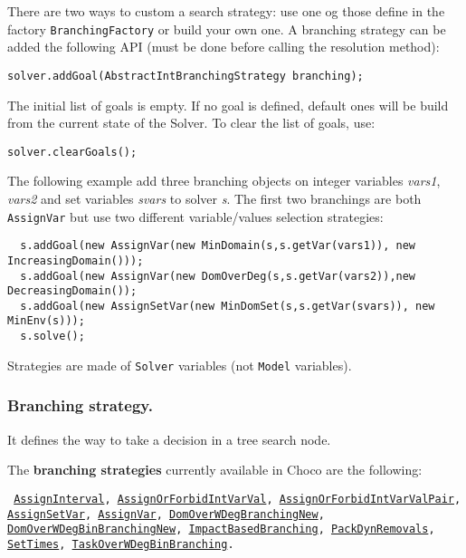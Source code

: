 There are two ways to custom a search strategy: use one og those define in the factory \texttt{BranchingFactory} or build your own one. 
A branching strategy can be added the following API (must be done before calling the resolution method):

\begin{lstlisting}
solver.addGoal(AbstractIntBranchingStrategy branching);
\end{lstlisting}
The initial list of goals is empty. If no goal is defined, default ones will be build from the current state of the Solver.
\noindent To clear the list of goals, use:
\begin{lstlisting}
solver.clearGoals();
\end{lstlisting} 

The following example add three branching objects on integer variables \emph{vars1}, \emph{vars2} and set variables \emph{svars} to solver \emph{s}. The first two branchings are both \texttt{AssignVar} but use two different variable/values selection strategies:
\begin{lstlisting}
  s.addGoal(new AssignVar(new MinDomain(s,s.getVar(vars1)), new IncreasingDomain()));
  s.addGoal(new AssignVar(new DomOverDeg(s,s.getVar(vars2)),new DecreasingDomain());
  s.addGoal(new AssignSetVar(new MinDomSet(s,s.getVar(svars)), new MinEnv(s)));
  s.solve();
\end{lstlisting}

\begin{note}
Strategies are made of \texttt{Solver} variables (not \texttt{Model} variables).
\end{note}

\subsubsection{Branching strategy.}\label{solver:branchstrat}\hypertarget{solver:branchstrat}{}
It defines the way to take a decision in a tree search node.
  
\noindent The \textbf{branching strategies} currently available in Choco are the following: 
\begin{notedef}\tt
\hyperlink{assigninterval:assignintervalbranchstrat}{AssignInterval}, \hyperlink{assignorforbidintvarval:assignorforbidintvarvalbranchstrat}{AssignOrForbidIntVarVal}, \hyperlink{assignorforbidintvarvalpair:assignorforbidintvarvalpairbranchstrat}{AssignOrForbidIntVarValPair}, \hyperlink{assignsetvar:assignsetvarbranchstrat}{AssignSetVar}, \hyperlink{assignvar:assignvarbranchstrat}{AssignVar}, \hyperlink{domoverwdeg:domoverwdegbranchstrat}{DomOverWDegBranchingNew}, \hyperlink{domoverwdegbin:domoverwdegbinbranchstrat}{DomOverWDegBinBranchingNew}, \hyperlink{impact:impactbranchstrat}{ImpactBasedBranching}, \hyperlink{packdynremovals:packdynremovalsbranchstrat}{PackDynRemovals}, \hyperlink{settimes:settimesbranchstrat}{SetTimes}, \hyperlink{taskdomoverwdeg:taskdomoverwdegbranchstrat}{TaskOverWDegBinBranching}.
\end{notedef}    


